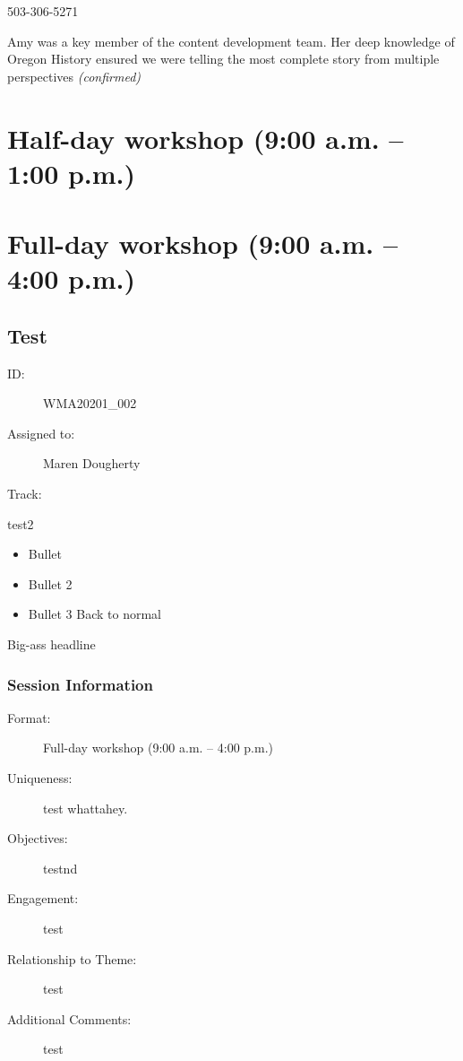 \documentclass{report}
\begin{document}
                503-306-5271\newline

                Amy was a key member of the content development team. Her deep knowledge of Oregon History ensured we were telling the most complete story from multiple perspectives
                \emph{ (confirmed) }
              
        
    \newpage
    \chapter*{ Half-day workshop (9:00 a.m. – 1:00 p.m.) }

      
        
        
    \newpage
    \chapter*{ Full-day workshop (9:00 a.m. – 4:00 p.m.) }

      
        
          \newpage
          \section{ Test }
            \begin{description}
              \item [ID:]
              WMA20201\_002

              \item [Assigned to:]Maren Dougherty~
                \item [Track:]
              \end{description}

              test2
\begin{itemize}
\item Bullet
\item Bullet 2
\item Bullet 3
Back to normal
\end{itemize}
Big-ass headline\newline

              \subsection*{Session Information}
                \begin{description}
                  \item [Format:] Full-day workshop (9:00 a.m. – 4:00 p.m.)
							    
							    \item [Uniqueness:]test whattahey.
							    \item [Objectives:]testnd
							    \item [Engagement:]test
							    \item [Relationship to Theme:]test
							    
                    \item [Additional Comments: ]test

                \end{description}
\end{document}
